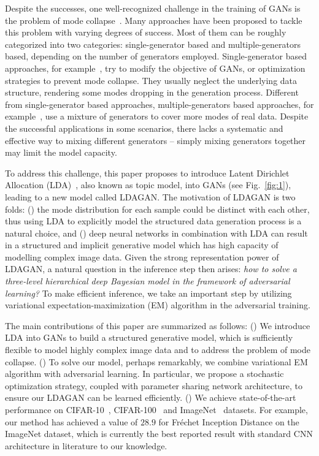 \documentclass{article}
\begin{document}
Despite the successes, one well-recognized challenge in the training of GANs is the problem of mode collapse~\cite{salimans2016improved,nguyen2017dual,miyato2018spectral,tran2018dist,tolstikhin2017adagan}.
Many approaches have been proposed to tackle this problem with varying degrees of success.
Most of them can be roughly categorized into two categories: single-generator based and multiple-generators based, depending on the number of generators employed.
Single-generator based approaches, for example~\cite{nguyen2017dual,miyato2018spectral,salimans2016improved,tran2018dist}, try to modify the objective of GANs, or optimization strategies to prevent mode collapse.
They usually neglect the underlying data structure, rendering some modes dropping in the generation process.
Different from single-generator based approaches, multiple-generators based approaches, for example~\cite{hoang2018mgan,tolstikhin2017adagan,arora2017generalization}, use a mixture of generators to cover more modes of real data. Despite the successful applications in some scenarios, there lacks a systematic and effective way to mixing different generators -- simply mixing generators together may limit the model capacity.


To address this challenge,
this paper proposes to introduce Latent Dirichlet Allocation (LDA)~\cite{blei2003latent}, also known as topic model, into GANs (see Fig.~\ref{fig:1}), leading to a new model called LDAGAN.
The motivation of LDAGAN is two folds: () the mode distribution for each sample could be distinct with each other, thus using LDA to explicitly model the structured data generation process is a natural choice, and () deep neural networks in combination with LDA can result in a structured and implicit generative model which has high capacity of modelling complex image data.
Given the strong representation power of LDAGAN, a natural question in the inference step then arises: \emph{how to solve a three-level hierarchical deep Bayesian model in the framework of adversarial learning?}
To make efficient inference, we take an important step by utilizing variational expectation-maximization (EM) algorithm in the adversarial training.



The main contributions of this paper are summarized as follows:
() We introduce LDA into GANs to build a structured generative model, which is sufficiently flexible to model highly complex image data and to address the problem of mode collapse.
() To solve our model, perhaps remarkably, we combine variational EM algorithm with adversarial learning.  In particular, we propose a stochastic optimization strategy, coupled with parameter sharing network architecture, to ensure our LDAGAN can be learned efficiently.
() We achieve state-of-the-art performance on CIFAR-10~\cite{krizhevsky2009learning}, CIFAR-100~\cite{krizhevsky2009learning} and ImageNet~\cite{russakovsky2015imagenet} datasets. For example, our method has achieved a value of $28.9$ for Fr\'{e}chet Inception Distance on the ImageNet dataset, which is currently the best reported result with standard CNN architecture in literature to our knowledge.
\end{document}
